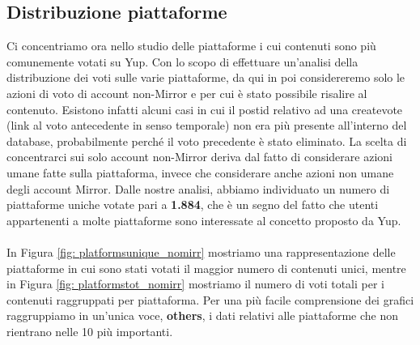 \subsection{Distribuzione piattaforme}
\label{platoforms_section}
Ci concentriamo ora nello studio delle piattaforme i cui contenuti sono più comunemente votati su Yup.
Con lo scopo di effettuare un'analisi della distribuzione dei voti sulle varie piattaforme, da qui in poi considereremo solo le azioni di voto di account non-Mirror e per cui è stato possibile risalire al contenuto.
Esistono infatti alcuni casi in cui il postid relativo ad una createvote (link al voto antecedente in senso temporale) non era più presente all'interno del database, probabilmente perché il voto precedente è stato eliminato.
La scelta di concentrarci sui solo account non-Mirror deriva dal fatto di considerare azioni umane fatte sulla piattaforma, invece che considerare anche azioni non umane degli account Mirror.
Dalle nostre analisi, abbiamo individuato un numero di piattaforme uniche votate pari a \textbf{1.884}, che è un segno del fatto che utenti appartenenti a molte piattaforme sono interessate al concetto proposto da Yup.
\\
\\
In Figura \ref{fig: platformsunique_nomirr} mostriamo una rappresentazione delle piattaforme in cui sono stati votati il maggior numero di contenuti unici, mentre in Figura \ref{fig: platformstot_nomirr} mostriamo il numero di voti totali per i contenuti raggruppati per piattaforma.
Per una più facile comprensione dei grafici raggruppiamo in un'unica voce, \textbf{others}, i dati relativi alle piattaforme che non rientrano nelle 10 più importanti.

